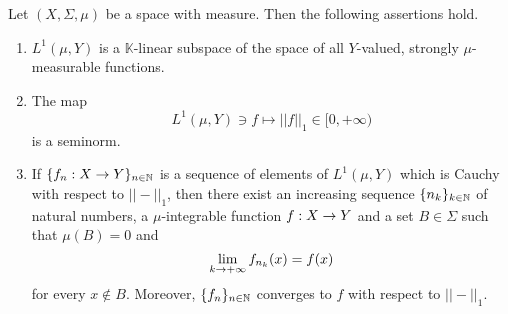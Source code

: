 \begin{theorem}[Riesz]\label{theorem:riesz_theorem}
Let $(X,\Sigma,\mu)$ be a space with measure. Then the following assertions hold.
\begin{enumerate}[label=\emph{\textbf{(\arabic*)}}, leftmargin=*]
\item $L^1(\mu,Y)$ is a $\mathbb{K}$-linear subspace of the space of all $Y$-valued, strongly $\mu$-measurable functions.
\item The map
$$L^1(\mu,Y)\ni f \mapsto ||f||_1\in [0,+\infty)$$
is a seminorm.
\item If $\{f_n:X\rightarrow Y\}_{n\in {\mathbb N}}$ is a sequence of elements of $L^1(\mu,Y)$ which is Cauchy with respect to $||-||_1$, then there exist an increasing sequence $\{n_k\}_{k\in {\mathbb N}}$ of natural numbers, a $\mu$-integrable function $f:X\rightarrow Y$ and a set $B\in \Sigma$ such that $\mu(B) = 0$ and
$$\lim_{k\rightarrow +\infty}f_{n_k}(x) = f(x)$$
for every $x \not \in B$. Moreover, $\{f_n\}_{n\in {\mathbb N}}$ converges to $f$ with respect to $||-||_1$.
\end{enumerate}
\end{theorem}
